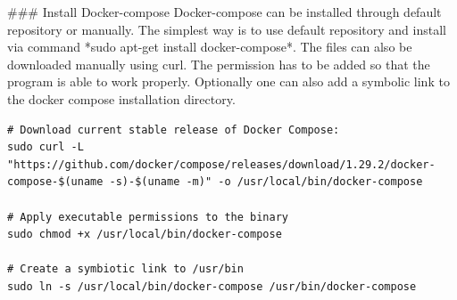 \documentclass{article}
\begin{document}
\begin{markdown}
### Install Docker-compose
Docker-compose can be installed through default repository or manually. The simplest way is to use default repository and install via command *sudo apt-get install docker-compose*. The files can also be downloaded manually using curl. The permission has to be added so that the program is able to work properly. Optionally one can also add a symbolic link to the docker compose installation directory.
\end{markdown}

\begin{verbatim}
# Download current stable release of Docker Compose:
sudo curl -L "https://github.com/docker/compose/releases/download/1.29.2/docker-compose-$(uname -s)-$(uname -m)" -o /usr/local/bin/docker-compose

# Apply executable permissions to the binary
sudo chmod +x /usr/local/bin/docker-compose

# Create a symbiotic link to /usr/bin
sudo ln -s /usr/local/bin/docker-compose /usr/bin/docker-compose

\end{verbatim}
\end{document}
